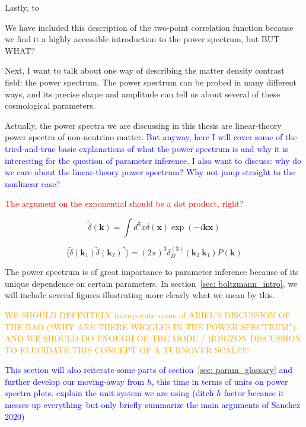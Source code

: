 Lastly, to 


We have included this description of the two-point correlation function
because we find it a highly accessible introduction to the power spectrum,
but BUT WHAT?

Next, I want to talk about one way of describing the matter density contrast 
field: the power spectrum. The power spectrum can be probed in many different 
ways, and its precise shape and amplitude can tell us about several of these 
cosmological parameters.

Actually, the power spectra we are discussing in this thesis are linear-theory
power spectra of non-neutrino matter. \textcolor{blue}{But anyway, here I will cover some of 
the tried-and-true basic explanations of what the power spectrum is and why it 
is interesting for the question of parameter inference. I also want to 
discuss: why do we care about the linear-theory power spectrum? Why not jump 
straight to the nonlinear case?}

\textcolor{red}{The argument on the exponential should be a dot product, 
right?}

\begin{equation}
\tilde{\delta} (\bm{k}) = \int d^3 x \delta(\bm{x}) \exp(-i \bm{k} \bm{x})
\end{equation}

\begin{equation}
\langle \tilde{\delta} (\bm{k}_1) \tilde{\delta} (\bm{k}_2)^* \rangle
=
(2 \pi)^3 \delta_D^{(3)} (\bm{k}_2 \ \bm{k}_1) P(\bm{k})
\end{equation}


The power spectrum is of great importance to parameter inference because of
its unique dependence on certain parameters.
In section~\ref{sec: boltzmann_intro}, we will include several figures 
illustrating more clearly what we mean by this.


\textcolor{orange}{WE SHOULD DEFINITELY incorporate some of ARIEL'S DISCUSSION 
OF THE BAO 
(``WHY ARE THERE
WIGGLES IN THE POWER SPECTRUM'') AND WE SHOULD DO ENOUGH OF THE MODE / HORIZON
DISCUSSION TO ELUCIDATE THIS CONCEPT OF A TURNOVER SCALE!!!}


\textcolor{blue}{This section will also reiterate some parts of 
section~\ref{sec: param_glossary} and further develop our moving-away from 
$h$, this time in terms of units on power spectra plots. explain the unit system
    we are using (ditch $h$ factor because it messes up everything--but
    only briefly summarize the main arguments of Sanchez 2020)}


